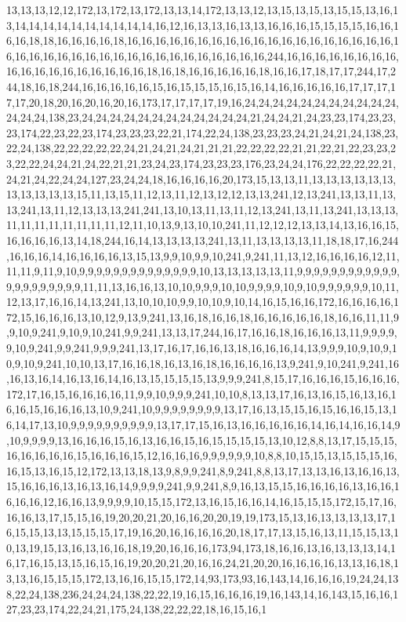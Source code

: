 13,13,13,12,12,172,13,172,13,172,13,13,14,172,13,13,12,13,15,13,15,13,15,15,13,16,13,14,14,14,14,14,14,14,14,14,14,16,12,16,13,13,16,13,13,16,16,16,15,15,15,15,16,16,16,16,18,18,16,16,16,16,18,16,16,16,16,16,16,16,16,16,16,16,16,16,16,16,16,16,16,16,16,16,16,16,16,16,16,16,16,16,16,16,16,16,16,16,16,16,16,244,16,16,16,16,16,16,16,16,16,16,16,16,16,16,16,16,16,16,18,16,18,16,16,16,16,16,18,16,16,17,18,17,17,244,17,244,18,16,18,244,16,16,16,16,16,15,16,15,15,15,16,15,16,14,16,16,16,16,16,17,17,17,17,17,20,18,20,16,20,16,20,16,173,17,17,17,17,19,16,24,24,24,24,24,24,24,24,24,24,24,24,24,24,138,23,24,24,24,24,24,24,24,24,24,24,24,24,21,24,24,21,24,23,23,174,23,23,23,174,22,23,22,23,174,23,23,23,22,21,174,22,24,138,23,23,23,24,21,24,21,24,138,23,22,24,138,22,22,22,22,22,24,21,24,21,24,21,21,21,22,22,22,22,21,21,22,21,22,23,23,23,22,22,24,24,21,24,22,21,21,23,24,23,174,23,23,23,176,23,24,24,176,22,22,22,22,21,24,21,24,22,24,24,127,23,24,24,18,16,16,16,16,20,173,15,13,13,11,13,13,13,13,13,13,13,13,13,13,13,15,11,13,15,11,12,13,11,12,13,12,12,13,13,241,12,13,241,13,13,11,13,13,241,13,11,12,13,13,13,241,241,13,10,13,11,13,11,12,13,241,13,11,13,241,13,13,13,11,11,11,11,11,11,11,11,12,11,10,13,9,13,10,10,241,11,12,12,12,13,13,14,13,16,16,15,16,16,16,16,13,14,18,244,16,14,13,13,13,13,241,13,11,13,13,13,13,11,18,18,17,16,244,16,16,16,14,16,16,16,16,13,15,13,9,9,10,9,9,10,241,9,241,11,13,12,16,16,16,16,12,11,11,11,9,11,9,10,9,9,9,9,9,9,9,9,9,9,9,9,9,9,10,13,13,13,13,13,11,9,9,9,9,9,9,9,9,9,9,9,9,9,9,9,9,9,9,9,9,9,11,11,13,16,16,13,10,10,9,9,9,10,10,9,9,9,9,10,9,10,9,9,9,9,9,9,10,11,12,13,17,16,16,14,13,241,13,10,10,10,9,9,10,10,9,10,14,16,15,16,16,172,16,16,16,16,172,15,16,16,16,13,10,12,9,13,9,241,13,16,18,16,16,18,16,16,16,16,16,18,16,16,11,11,9,9,10,9,241,9,10,9,10,241,9,9,241,13,13,17,244,16,17,16,16,18,16,16,16,13,11,9,9,9,9,9,10,9,241,9,9,241,9,9,9,241,13,17,16,17,16,16,13,18,16,16,16,14,13,9,9,9,10,9,10,9,10,9,10,9,241,10,10,13,17,16,16,18,16,13,16,18,16,16,16,16,13,9,241,9,10,241,9,241,16,16,13,16,14,16,13,16,14,16,13,15,15,15,15,13,9,9,9,241,8,15,17,16,16,16,15,16,16,16,172,17,16,15,16,16,16,16,11,9,9,10,9,9,9,241,10,10,8,13,13,17,16,13,16,15,16,13,16,16,16,15,16,16,16,13,10,9,241,10,9,9,9,9,9,9,9,9,13,17,16,13,15,15,16,15,16,16,15,13,16,14,17,13,10,9,9,9,9,9,9,9,9,9,9,13,17,17,15,16,13,16,16,16,16,16,14,16,14,16,16,14,9,10,9,9,9,9,13,16,16,16,15,16,13,16,16,15,16,15,15,15,15,13,10,12,8,8,13,17,15,15,15,16,16,16,16,16,15,16,16,16,15,12,16,16,16,9,9,9,9,9,9,10,8,8,10,15,15,13,15,15,15,16,16,15,13,16,15,12,172,13,13,18,13,9,8,9,9,241,8,9,241,8,8,13,17,13,13,16,13,16,16,13,15,16,16,16,13,16,13,16,14,9,9,9,9,241,9,9,241,8,9,16,13,15,15,16,16,16,16,13,16,16,16,16,16,12,16,16,13,9,9,9,9,10,15,15,172,13,16,15,16,16,14,16,15,15,15,172,15,17,16,16,16,13,17,15,15,16,19,20,20,21,20,16,16,20,20,19,19,173,15,13,16,13,13,13,13,17,16,15,15,13,13,15,15,15,17,19,16,20,16,16,16,16,20,18,17,17,13,15,16,13,11,15,15,13,10,13,19,15,13,16,13,16,16,18,19,20,16,16,16,173,94,173,18,16,16,13,16,13,13,13,14,16,17,16,15,13,15,16,15,16,19,20,20,21,20,16,16,24,21,20,20,16,16,16,16,13,13,16,18,13,13,16,15,15,15,172,13,16,16,15,15,172,14,93,173,93,16,143,14,16,16,16,19,24,24,138,22,24,138,236,24,24,24,138,22,22,19,16,15,16,16,16,19,16,143,14,16,143,15,16,16,127,23,23,174,22,24,21,175,24,138,22,22,22,18,16,15,16,1
